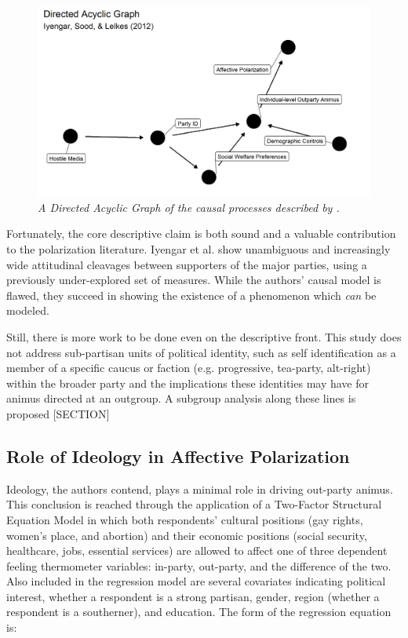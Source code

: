 \documentclass[12pt]{article}
\begin{document}
\begin{figure}[h!]
\center\includegraphics[width=6in]{ext-dag.png}
\caption{\label{fig:dag}\textit{A Directed Acyclic Graph of the causal processes described by \citeauthor{iyengar2012affect}.}}
\end{figure}

Fortunately, the core descriptive claim is both sound and a valuable contribution to the polarization literature. Iyengar et al. show unambiguous and increasingly wide attitudinal cleavages between supporters of the major parties, using a previously under-explored set of measures. While the authors' causal model is flawed, they succeed in showing the existence of a phenomenon which \textit{can} be modeled.

Still, there is more work to be done even on the descriptive front. This study does not address sub-partisan units of political identity, such as self identification as a member of a specific caucus or faction (e.g. progressive, tea-party, alt-right) within the broader party and the implications these identities may have for animus directed at an outgroup. A subgroup analysis along these lines is proposed [SECTION]

\subsection{Role of Ideology in Affective Polarization}

Ideology, the authors contend, plays a minimal role in driving out-party animus. This conclusion is reached through the application of a Two-Factor Structural Equation Model in which both respondents' cultural positions (gay rights, women's place, and abortion) and their economic positions (social security, healthcare, jobs, essential services) are allowed to affect one of three dependent feeling thermometer variables: in-party, out-party, and the difference of the two. Also included in the regression model are several covariates indicating political interest, whether a respondent is a strong partisan, gender, region (whether a respondent is a southerner), and education. The form of the regression equation is:
\end{document}
